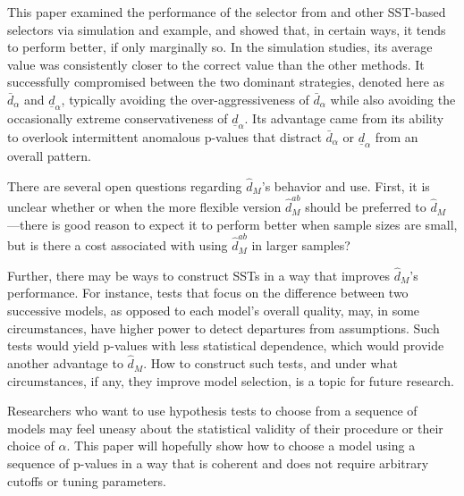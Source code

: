 \documentclass[sts]{imsart}\usepackage[]{graphicx}\usepackage[]{color}
\newcommand{\dalphaU}{\bar{d}_\alpha}
\newcommand{\dalphaB}{\underline{d}_\alpha}
\newcommand{\dhatm}{\hat{d}_M}
\newcommand{\dhatmab}{\hat{d}^{ab}_M}
\begin{document}
This paper examined the performance of the selector from
\citet{mallik} and other SST-based selectors via simulation and
example, and showed that, in certain ways, it tends to perform better,
if only marginally so.
In the simulation studies, its average value was consistently closer
to the correct value than the other methods.
It successfully compromised between the two dominant strategies,
denoted here as $\dalphaU$ and $\dalphaB$, typically avoiding the
over-aggressiveness of $\dalphaU$ while also avoiding the
occasionally extreme conservativeness of $\dalphaB$.
Its advantage came from its ability to overlook intermittent anomalous
p-values that distract $\dalphaU$ or $\dalphaB$ from an overall
pattern.

There are several open questions regarding $\dhatm$'s behavior and
use.
First, it is unclear whether or when the more flexible version
$\dhatmab$ should be preferred to $\dhatm$---there is good reason to
expect it to perform better when sample sizes are small, but is there
a cost associated with using $\dhatmab$ in larger samples?

Further, there may be ways to construct SSTs in a way that improves
$\dhatm$'s performance.
For instance, tests that focus on the difference between two
successive models, as opposed to each model's overall quality, may, in
some circumstances, have higher power to detect departures from
assumptions.
Such tests would yield p-values with less statistical dependence,
which would provide another advantage to $\dhatm$.
How to construct such tests, and under what circumstances, if any,
they improve model selection, is a topic for future research.

Researchers who want to use hypothesis tests to choose from a sequence
of models may feel uneasy about the statistical validity of their
procedure or their choice of $\alpha$.
This paper will hopefully show how to choose a model using a sequence
of p-values in a way that is coherent and does not require arbitrary
cutoffs or tuning parameters.





\end{document}
